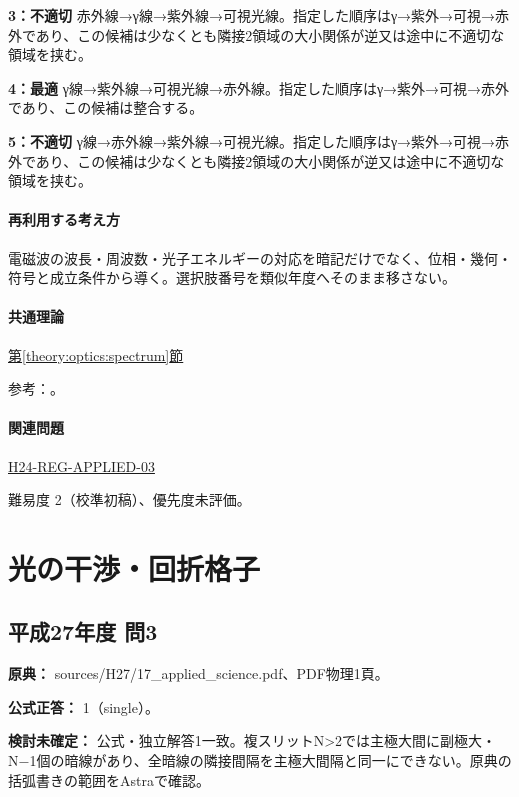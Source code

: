 \noindent\textbf{3：不適切} 赤外線→γ線→紫外線→可視光線。指定した順序はγ→紫外→可視→赤外であり、この候補は少なくとも隣接2領域の大小関係が逆又は途中に不適切な領域を挟む。\par

\noindent\textbf{4：最適} γ線→紫外線→可視光線→赤外線。指定した順序はγ→紫外→可視→赤外であり、この候補は整合する。\par

\noindent\textbf{5：不適切} γ線→赤外線→紫外線→可視光線。指定した順序はγ→紫外→可視→赤外であり、この候補は少なくとも隣接2領域の大小関係が逆又は途中に不適切な領域を挟む。\par

\paragraph{再利用する考え方} 電磁波の波長・周波数・光子エネルギーの対応を暗記だけでなく、位相・幾何・符号と成立条件から導く。選択肢番号を類似年度へそのまま移さない。

\paragraph{共通理論} \hyperref[theory:optics:spectrum]{第\ref*{theory:optics:spectrum}節}

\par 参考：\cite{os_spectrum}。

\paragraph{関連問題} \hyperref[q:h24-reg-applied-03]{H24-REG-APPLIED-03}

\par 難易度 2（校準初稿）、優先度未評価。

\section{光の干渉・回折格子}

\subsection{平成27年度 問3}
\label{q:h27-reg-applied-03}

\noindent\textbf{原典：} sources/H27/17\_applied\_science.pdf、PDF物理1頁。

\textbf{公式正答：} 1（single）。

\par\textbf{検討未確定：} 公式・独立解答1一致。複スリットN>2では主極大間に副極大・N−1個の暗線があり、全暗線の隣接間隔を主極大間隔と同一にできない。原典の括弧書きの範囲をAstraで確認。

